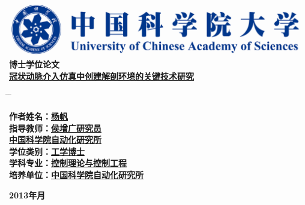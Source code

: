 \vspace*{1.2cm} %
\begin{center}
  \includegraphics[width=13.5cm]{Figures/misc/UCAS}\\
\vspace{1.7cm} {\yihao \hei \textbf{博士学位论文}}\\
\vspace{2.4cm}
{\xiaoerhao \song \textbf{\underline{冠状动脉介入仿真中创建解剖环境的关键技术研究}}}\\
\end{center}
\sanhao \vspace{2.0cm}
\begin{tabbing}
\hspace*{-0.8cm} \= \hspace{6.4cm} \= \kill

\>\textbf{作者姓名：\underline{\hspace{4.8cm}杨\;\;\;\;帆\;\;\hspace{6.3cm}}}\\
\>\textbf{指导教师：\underline{\hspace{4.8cm}侯增广\;\;研究员\hspace{4.6cm}}}\\
\>\textbf{\hspace*{2.8cm}\underline{\hspace{3cm}中国科学院自动化研究所 \hspace{4cm}}}\\

\>\textbf{学位类别：\underline{\hspace{4.8cm}工学博士\hspace{6.0cm}}}\\

\>\textbf{学科专业：\underline{\hspace{3.55cm}控制理论与控制工程\hspace{4.5cm}}}\\


\>\textbf{培养单位：\underline{\hspace{3cm}中国科学院自动化研究所 \hspace{4cm}}}\\

\end{tabbing}
\begin{center}
\vspace{1.0cm}
  \textbf{2013\;\;年\;\;\;月}
\end{center}
